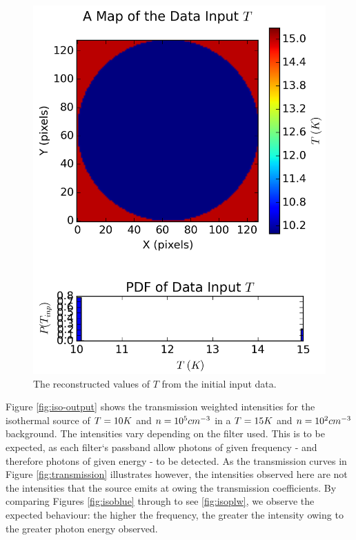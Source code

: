 \documentclass{report}
\begin{document}
\begin{figure}[H]
{\begin{minipage}[b]{0.34\linewidth}
    \includegraphics[width=\linewidth]{../img/sim/map_T_data.png}
    \caption{\protect The reconstructed values of $T$ from the initial input data.}\label{fig:map_T_data}
    \vspace{1.5ex}
  \end{minipage}}
\end{figure}

Figure \ref{fig:iso-output} shows the transmission weighted intensities for the isothermal source of $T=10\/K$ and $n=10^{5}\/cm^{-3}$ in a $T=15\/K$ and $n=10^{2}\/cm^{-3}$ background. The intensities vary depending on the filter used. This is to be expected, as each filter`s passband allow photons of given frequency - and therefore photons of given energy - to be detected. As the transmission curves in Figure \ref{fig:transmission} illustrates however, the intensities observed here are not the intensities that the source emits at owing the transmission coefficients. By comparing Figures \ref{fig:isoblue} through to see \ref{fig:isoplw}, we observe the expected behaviour: the higher the frequency, the greater the intensity owing to the greater photon energy observed.
\end{document}

